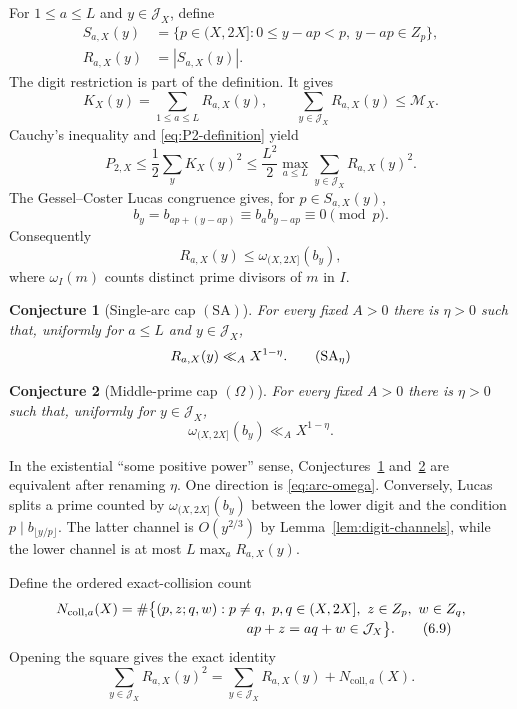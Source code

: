\documentclass[11pt]{amsart}
\theoremstyle{plain}
\newtheorem{conjecture}{Conjecture}
\theoremstyle{remark}
\begin{document}
For $1\leq a\leq L$ and $y\in\mathcal J_X$, define
\begin{align*}
 S_{a,X}(y)
 &=\{p\in(X,2X]:0\leq y-ap<p,\ y-ap\in Z_p\},\\
 R_{a,X}(y)&=|S_{a,X}(y)|.
\end{align*}
The digit restriction is part of the definition.  It gives
\[
 K_X(y)=\sum_{1\leq a\leq L}R_{a,X}(y),
 \qquad
 \sum_{y\in\mathcal J_X}R_{a,X}(y)\leq\mathcal M_X.
 \tag{6.6}\label{eq:arc-mass}
\]
Cauchy's inequality and \eqref{eq:P2-definition} yield
\[
 P_{2,X}
 \leq\frac12\sum_yK_X(y)^2
 \leq\frac{L^2}{2}\max_{a\leq L}
       \sum_{y\in\mathcal J_X}R_{a,X}(y)^2.
 \tag{6.7}\label{eq:single-arc-collapse}
\]
The Gessel--Coster Lucas congruence gives, for $p\in S_{a,X}(y)$,
\[
 b_y=b_{ap+(y-ap)}\equiv b_a b_{y-ap}\equiv0\pmod p.
\]
Consequently
\[
 R_{a,X}(y)\leq
 \omega_{(X,2X]}(b_y),
 \tag{6.8}\label{eq:arc-omega}
\]
where $\omega_I(m)$ counts distinct prime divisors of $m$ in $I$.

\begin{conjecture}[Single-arc cap $(\mathrm{SA})$]
\label{conj:SA}
For every fixed $A>0$ there is $\eta>0$ such that, uniformly for
$a\leq L$ and $y\in\mathcal J_X$,
\[
 R_{a,X}(y)\ll_A X^{1-\eta}.
 \tag{$\mathrm{SA}_\eta$}\label{eq:SA}
\]
\end{conjecture}

\begin{conjecture}[Middle-prime cap $(\Omega)$]
\label{conj:Omega}
For every fixed $A>0$ there is $\eta>0$ such that, uniformly for
$y\in\mathcal J_X$,
\[
 \omega_{(X,2X]}(b_y)\ll_A X^{1-\eta}.
 \tag{$\Omega_\eta$}\label{eq:Omega}
\]
\end{conjecture}

In the existential ``some positive power'' sense,
Conjectures~\ref{conj:SA} and~\ref{conj:Omega} are equivalent after
renaming $\eta$.  One direction is \eqref{eq:arc-omega}.  Conversely,
Lucas splits a prime counted by $\omega_{(X,2X]}(b_y)$ between the
lower digit and the condition $p\mid b_{\lfloor y/p\rfloor}$.  The
latter channel is $O(y^{2/3})$ by Lemma~\ref{lem:digit-channels}, while
the lower channel is at most $L\max_aR_{a,X}(y)$.

Define the ordered exact-collision count
\begin{align}
 N_{\mathrm{coll},a}(X)
 &=\#\bigl\{(p,z;q,w):p\ne q,\ p,q\in(X,2X],
       \ z\in Z_p,\ w\in Z_q,\notag\\[-2pt]
 &\hspace{92pt}ap+z=aq+w\in\mathcal J_X\bigr\}.
 \tag{6.9}\label{eq:Ncoll-definition}
\end{align}
Opening the square gives the exact identity
\[
 \sum_{y\in\mathcal J_X}R_{a,X}(y)^2
 =\sum_{y\in\mathcal J_X}R_{a,X}(y)
  +N_{\mathrm{coll},a}(X).
 \tag{6.10}\label{eq:Ncoll-identity}
\]
\end{document}
